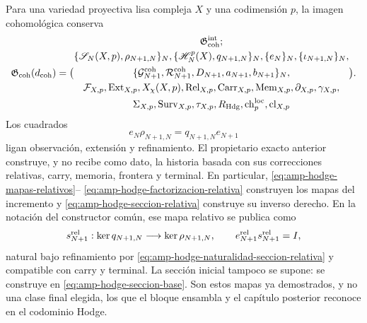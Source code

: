 Para una variedad proyectiva lisa compleja $X$ y una codimensión $p$, la imagen
cohomológica conserva
\begin{equation}\label{eq:pdf2-g-coh-explicito}
 \mathfrak G_{\rm coh}(d_{\rm coh})=
 \bigl(
 \begin{gathered}
  \mathfrak G_{\rm coh}^{\rm int};\\
  \{\mathscr S_N(X,p),\rho_{N+1,N}\}_N,
  \{\mathscr H_N^p(X),q_{N+1,N}\}_N,
  \{e_N\}_N,
  \{\iota_{N+1,N}\}_N,\\
  \{\mathcal G_{N+1}^{\rm coh},\mathcal R_{N+1}^{\rm coh},
       D_{N+1},a_{N+1},b_{N+1}\}_N,\\
  \mathcal F_{X,p},\operatorname{Ext}_{X,p},X_\chi(X,p),
  \operatorname{Rel}_{X,p},\operatorname{Carr}_{X,p},
  \operatorname{Mem}_{X,p},\partial_{X,p},\gamma_{X,p},\\
  \Sigma_{X,p},\operatorname{Surv}_{X,p},\tau_{X,p},
  R_{\rm Hdg},\operatorname{ch}^{\rm loc}_p,\operatorname{cl}_{X,p}
 \end{gathered}
 \bigr).
\end{equation}
Los cuadrados
\begin{equation}\label{eq:pdf2-g-coh-cuadrados}
 e_N\rho_{N+1,N}=q_{N+1,N}e_{N+1}
\end{equation}
ligan observación, extensión y refinamiento. El propietario exacto anterior
construye, y no recibe como dato, la historia basada con sus correcciones
relativas, carry, memoria, frontera y terminal. En particular,
\eqref{eq:amp-hodge-mapas-relativos}--
\eqref{eq:amp-hodge-factorizacion-relativa} construyen los mapas del
incremento y \eqref{eq:amp-hodge-seccion-relativa} construye su inverso
derecho. En la notación del constructor común, ese mapa relativo se publica
como
\begin{equation}\label{eq:pdf2-g-coh-seccion-dato}
 s_{N+1}^{\rm rel}:\ker q_{N+1,N}\longrightarrow\ker\rho_{N+1,N},
 \qquad
 e_{N+1}^{\rm rel}s_{N+1}^{\rm rel}=I,
\end{equation}
natural bajo refinamiento por
\eqref{eq:amp-hodge-naturalidad-seccion-relativa} y compatible con carry y
terminal. La sección inicial tampoco se supone: se construye en
\eqref{eq:amp-hodge-seccion-base}. Son estos mapas ya demostrados, y no una
clase final elegida, los que el bloque ensambla y el capítulo posterior
reconoce en el codominio Hodge.

